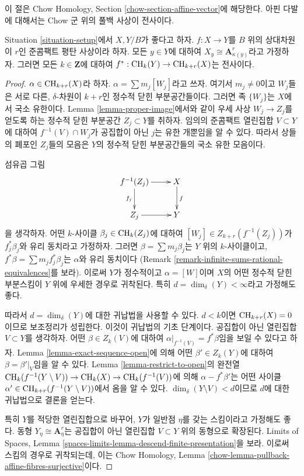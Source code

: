 \noindent
이 절은 Chow Homology, Section \ref{chow-section-affine-vector}에 해당한다.
아핀 다발에 대해서는 Chow 군 위의 풀백 사상이 전사이다.

\begin{lemma}
\label{lemma-pullback-affine-fibres-surjective}
Situation \ref{situation-setup}에서 $X, Y/B$가 좋다고 하자.
$f : X \to Y$를 $B$ 위의 상대차원이 $r$인 준콤팩트 평탄 사상이라 하자.
모든 $y \in Y$에 대하여
$X_y \cong \mathbf{A}^r_{\kappa(y)}$라고 가정하자.
그러면 모든 $k \in \mathbf{Z}$에 대하여
$f^* : \mathop{\mathrm{CH}}\nolimits_k(Y) \to \mathop{\mathrm{CH}}\nolimits_{k + r}(X)$는 전사이다.
\end{lemma}

\begin{proof}
$\alpha \in \mathop{\mathrm{CH}}\nolimits_{k + r}(X)$라 하자. $\alpha = \sum m_j[W_j]$라고 쓰자.
여기서 $m_j \not = 0$이고 $W_j$들은 서로 다른,
$\delta$-차원이 $k + r$인 정수적 닫힌 부분공간들이다.
그러면 족 $\{W_j\}$는 $X$에서 국소 유한이다.
Lemma \ref{lemma-proper-image}에서와 같이 우세 사상
$W_j \to Z_j$를 얻도록 하는 정수적 닫힌 부분공간
$Z_j \subset Y$를 취하자. 임의의 준콤팩트 열린집합
$V \subset Y$에 대하여 $f^{-1}(V) \cap W_j$가 공집합이 아닌
$j$는 유한 개뿐임을 알 수 있다. 따라서 상들의 폐포인 $Z_j$들의
모음은 $Y$의 정수적 닫힌 부분공간들의 국소 유한 모음이다.

\medskip\noindent
섬유곱 그림
$$
\xymatrix{
f^{-1}(Z_j) \ar[r] \ar[d]_{f_j} & X \ar[d]^f \\
Z_j \ar[r] & Y
}
$$
을 생각하자. 어떤 $k$-사이클 $\beta_j \in \mathop{\mathrm{CH}}\nolimits_k(Z_j)$에 대하여
$[W_j] \in Z_{k + r}(f^{-1}(Z_j))$가 $f_j^*\beta_j$와
유리 동치라고 가정하자. 그러면
$\beta = \sum m_j \beta_j$는 $Y$ 위의 $k$-사이클이고,
$f^*\beta = \sum m_j f_j^*\beta_j$는 $\alpha$와 유리 동치이다
(Remark \ref{remark-infinite-sums-rational-equivalences}를 보라).
이로써 $Y$가 정수적이고 $\alpha = [W]$이며
$X$의 어떤 정수적 닫힌 부분스킴이 $Y$ 위에 우세한 경우로 귀착된다.
특히 $d = \dim_\delta(Y) < \infty$라고 가정해도 좋다.

\medskip\noindent
따라서 $d = \dim_\delta(Y)$에 대한 귀납법을 사용할 수 있다.
$d < k$이면 $\mathop{\mathrm{CH}}\nolimits_{k + r}(X) = 0$이므로 보조정리가 성립한다.
이것이 귀납법의 기초 단계이다. 공집합이 아닌 열린집합
$V \subset Y$를 생각하자. 어떤 $\beta \in Z_k(V)$에 대하여
$\alpha|_{f^{-1}(V)} = f^*\beta$임을 보일 수 있다고 하자.
Lemma \ref{lemma-exact-sequence-open}에 의해 어떤
$\beta' \in Z_k(Y)$에 대하여 $\beta = \beta'|_V$임을 알 수 있다.
Lemma \ref{lemma-restrict-to-open}의 완전열
$\mathop{\mathrm{CH}}\nolimits_k(f^{-1}(Y \setminus V)) \to \mathop{\mathrm{CH}}\nolimits_k(X) \to \mathop{\mathrm{CH}}\nolimits_k(f^{-1}(V))$에 의해
$\alpha - f^*\beta'$는 어떤 사이클
$\alpha' \in \mathop{\mathrm{CH}}\nolimits_{k + r}(f^{-1}(Y \setminus V))$에서 옴을 알 수 있다.
$\dim_\delta(Y \setminus V) < d$이므로 $d$에 대한 귀납법으로 결론을 얻는다.

\medskip\noindent
특히 $Y$를 적당한 열린집합으로 바꾸어, $Y$가 일반점
$\eta$를 갖는 스킴이라고 가정해도 좋다. 동형
$Y_\eta \cong \mathbf{A}^r_\eta$는 공집합이 아닌 열린집합
$V \subset Y$ 위의 동형으로 확장된다. Limits of Spaces, Lemma
\ref{spaces-limits-lemma-descend-finite-presentation}을 보라.
이로써 스킴의 경우로 귀착되는데, 이는 Chow Homology, Lemma
\ref{chow-lemma-pullback-affine-fibres-surjective}이다.
\end{proof}

